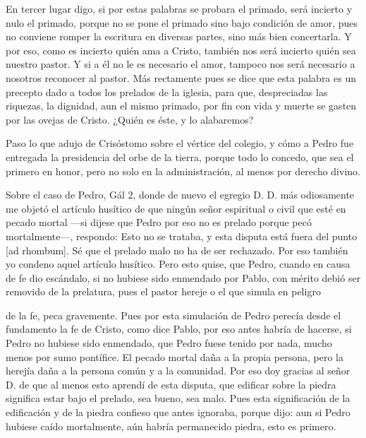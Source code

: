 En tercer lugar digo, si por estas palabras se probara el primado, será incierto y nulo el primado, porque no se pone el primado sino bajo condición de amor, pues no conviene romper la escritura en diversas partes, sino más bien concertarla. Y por eso, como es incierto quién ama a Cristo, también nos será incierto quién sea nuestro pastor. Y si a él no le es necesario el amor, tampoco nos será necesario a nosotros reconocer al pastor. Más rectamente pues se dice que esta palabra es un precepto dado a todos los prelados de la iglesia, para que, despreciadas las riquezas, la dignidad, aun el mismo primado, por fin con vida y muerte se gasten por las ovejas de Cristo. ¿Quién es éste, y lo alabaremos?

Paso lo que adujo de Crisóstomo sobre el vértice del colegio, y cómo a Pedro fue entregada la presidencia del orbe de la tierra, porque todo lo concedo, que sea el primero en honor, pero no solo en la administración, al menos por derecho divino.

Sobre el caso de Pedro, Gál 2, donde de nuevo el egregio D. D. más odiosamente me objetó el artículo husítico de que ningún señor espiritual o civil que esté en pecado mortal —si dijese que Pedro por eso no es prelado porque pecó mortalmente—, respondo: Esto no se trataba, y esta disputa está fuera del punto [ad rhombum]. Sé que el prelado malo no ha de ser rechazado. Por eso también yo condeno aquel artículo husítico. Pero esto quise, que Pedro, cuando en causa de fe dio escándalo, si no hubiese sido enmendado por Pablo, con mérito debió ser removido de la prelatura, pues el pastor hereje o el que simula en peligro

de la fe, peca gravemente. Pues por esta simulación de Pedro perecía desde el fundamento la fe de Cristo, como dice Pablo, por eso antes habría de hacerse, si Pedro no hubiese sido enmendado, que Pedro fuese tenido por nada, mucho menos por sumo pontífice. El pecado mortal daña a la propia persona, pero la herejía daña a la persona común y a la comunidad. Por eso doy gracias al señor D. de que al menos esto aprendí de esta disputa, que edificar sobre la piedra significa estar bajo el prelado, sea bueno, sea malo. Pues esta significación de la edificación y de la piedra confieso que antes ignoraba, porque dijo: aun si Pedro hubiese caído mortalmente, aún habría permanecido piedra, esto es primero.

